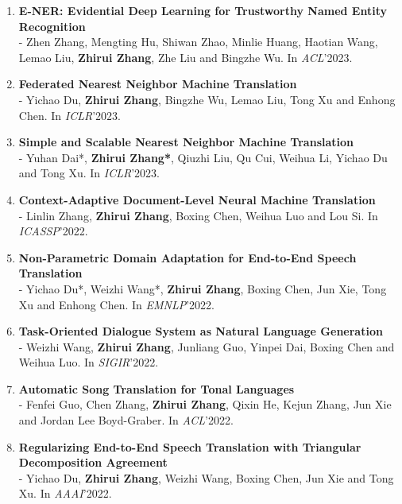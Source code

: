 \documentclass{resume}
\begin{document}
\begin{enumerate}
\item \normalsize \textbf{E-NER: Evidential Deep Learning for Trustworthy Named Entity Recognition}\\
\small - Zhen Zhang, Mengting Hu, Shiwan Zhao, Minlie Huang, Haotian Wang, Lemao Liu, \textbf{Zhirui Zhang}, Zhe Liu and Bingzhe Wu.  In \textit{ACL}'2023.

\item \normalsize \textbf{Federated Nearest Neighbor Machine Translation}\\
\small - Yichao Du, \textbf{Zhirui Zhang}, Bingzhe Wu, Lemao Liu, Tong Xu and Enhong Chen. In \textit{ICLR}'2023.

\item \normalsize \textbf{Simple and Scalable Nearest Neighbor Machine Translation}\\
\small - Yuhan Dai*, \textbf{Zhirui Zhang*}, Qiuzhi Liu, Qu Cui, Weihua Li, Yichao Du and Tong Xu. In \textit{ICLR}'2023.

\item \normalsize \textbf{Context-Adaptive Document-Level Neural Machine Translation}\\
\small - Linlin Zhang, \textbf{Zhirui Zhang}, Boxing Chen, Weihua Luo and Lou Si. In \textit{ICASSP}'2022.

\item \normalsize \textbf{Non-Parametric Domain Adaptation for End-to-End Speech Translation}\\
\small - Yichao Du*, Weizhi Wang*, \textbf{Zhirui Zhang}, Boxing Chen, Jun Xie, Tong Xu and Enhong Chen. In \textit{EMNLP}'2022.

\item \normalsize \textbf{Task-Oriented Dialogue System as Natural Language Generation}\\
\small - Weizhi Wang, \textbf{Zhirui Zhang}, Junliang Guo, Yinpei Dai, Boxing Chen and Weihua Luo. In \textit{SIGIR}'2022.

\item \normalsize \textbf{Automatic Song Translation for Tonal Languages}\\
\small - Fenfei Guo, Chen Zhang, \textbf{Zhirui Zhang}, Qixin He, Kejun Zhang, Jun Xie and Jordan Lee Boyd-Graber. In \textit{ACL}'2022.


\item \normalsize \textbf{Regularizing End-to-End Speech Translation with Triangular Decomposition Agreement}\\
\small - Yichao Du, \textbf{Zhirui Zhang}, Weizhi Wang, Boxing Chen, Jun Xie and Tong Xu. In \textit{AAAI}'2022.


\end{enumerate}
\end{document}

